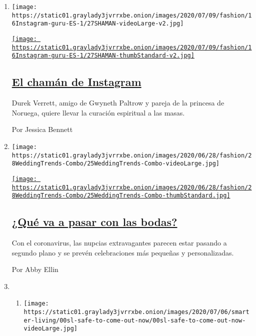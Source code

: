 \begin{enumerate}
\def\labelenumi{\arabic{enumi}.}
\item
  \texttt{[image: https://static01.graylady3jvrrxbe.onion/images/2020/07/09/fashion/16Instagram-guru-ES-1/27SHAMAN-videoLarge-v2.jpg]}

  \href{/es/2020/07/16/espanol/estilos-de-vida/durek-verrett-chaman.html}{\texttt{[image: https://static01.graylady3jvrrxbe.onion/images/2020/07/09/fashion/16Instagram-guru-ES-1/27SHAMAN-thumbStandard-v2.jpg]}}

  \hypertarget{el-chamuxe1n-de-instagram}{%
  \subsection{\texorpdfstring{\href{/es/2020/07/16/espanol/estilos-de-vida/durek-verrett-chaman.html}{El
  chamán de
  Instagram}}{El chamán de Instagram}}\label{el-chamuxe1n-de-instagram}}

  Durek Verrett, amigo de Gwyneth Paltrow y pareja de la princesa de
  Noruega, quiere llevar la curación espiritual a las masas.

  Por Jessica Bennett
\item
  \texttt{[image: https://static01.graylady3jvrrxbe.onion/images/2020/06/28/fashion/28WeddingTrends-Combo/25WeddingTrends-Combo-videoLarge.jpg]}

  \href{/es/2020/07/18/espanol/estilos-de-vida/bodas-coronavirus.html}{\texttt{[image: https://static01.graylady3jvrrxbe.onion/images/2020/06/28/fashion/28WeddingTrends-Combo/25WeddingTrends-Combo-thumbStandard.jpg]}}

  \hypertarget{quuxe9-va-a-pasar-con-las-bodas}{%
  \subsection{\texorpdfstring{\href{/es/2020/07/18/espanol/estilos-de-vida/bodas-coronavirus.html}{¿Qué
  va a pasar con las
  bodas?}}{¿Qué va a pasar con las bodas?}}\label{quuxe9-va-a-pasar-con-las-bodas}}

  Con el coronavirus, las nupcias extravagantes parecen estar pasando a
  segundo plano y se prevén celebraciones más pequeñas y personalizadas.

  Por Abby Ellin
\item
  \begin{enumerate}
  \def\labelenumii{\arabic{enumii}.}
  \item
    \texttt{[image: https://static01.graylady3jvrrxbe.onion/images/2020/07/06/smarter-living/00sl-safe-to-come-out-now/00sl-safe-to-come-out-now-videoLarge.jpg]}


\end{enumerate}
\end{enumerate}
